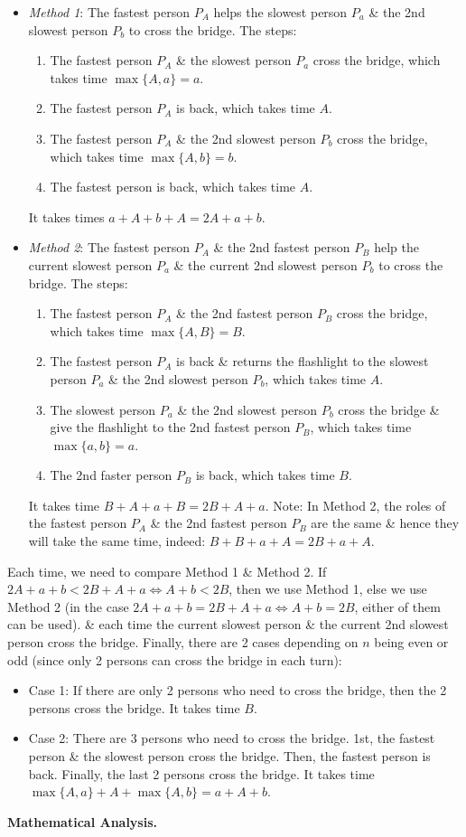 \documentclass{article}
\begin{document}
\begin{itemize}
	\item {\it Method 1}: The fastest person $P_A$ helps the slowest person $P_a$ \& the 2nd slowest person $P_b$ to cross the bridge. The steps:
	\begin{enumerate}
		\item The fastest person $P_A$ \& the slowest person $P_a$ cross the bridge, which takes time $\max\{A,a\} = a$.
		\item The fastest person $P_A$ is back, which takes time $A$.
		\item The fastest person $P_A$ \& the 2nd slowest person $P_b$ cross the bridge, which takes time $\max\{A,b\} = b$.
		\item The fastest person is back, which takes time $A$.
	\end{enumerate}
	It takes times $a + A + b + A = 2A + a + b$.
	\item {\it Method 2}: The fastest person $P_A$ \& the 2nd fastest person $P_B$ help the current slowest person $P_a$ \& the current 2nd slowest person $P_b$ to cross the bridge. The steps:
	\begin{enumerate}
		\item The fastest person $P_A$ \& the 2nd fastest person $P_B$ cross the bridge, which takes time $\max\{A,B\} = B$.
		\item The fastest person $P_A$ is back \& returns the flashlight to the slowest person $P_a$ \& the 2nd slowest person $P_b$, which takes time $A$.
		\item The slowest person $P_a$ \& the 2nd slowest person $P_b$ cross the bridge \& give the flashlight to the 2nd fastest person $P_B$, which takes time $\max\{a,b\} = a$.
		\item The 2nd faster person $P_B$ is back, which takes time $B$.
	\end{enumerate}
	It takes time $B + A + a + B = 2B + A + a$. Note: In Method 2, the roles of the fastest person $P_A$ \& the 2nd fastest person $P_B$ are the same \& hence they will take the same time, indeed: $B + B + a + A = 2B + a + A$.
\end{itemize}
Each time, we need to compare Method 1 \& Method 2. If $2A + a + b < 2B + A + a\Leftrightarrow A + b < 2B$, then we use Method 1, else we use Method 2 (in the case $2A + a + b = 2B + A + a\Leftrightarrow A + b = 2B$, either of them can be used). \& each time the current slowest person \& the current 2nd slowest person cross the bridge. Finally, there are 2 cases depending on $n$ being even or odd (since only 2 persons can cross the bridge in each turn):
\begin{itemize}
	\item Case 1: If there are only 2 persons who need to cross the bridge, then the 2 persons cross the bridge. It takes time $B$.
	\item Case 2: There are 3 persons who need to cross the bridge. 1st, the fastest person \& the slowest person cross the bridge. Then, the fastest person is back. Finally, the last 2 persons cross the bridge. It  takes time $\max\{A,a\} + A + \max\{A,b\} = a + A + b$.
\end{itemize}
\textbf{\textsf{Mathematical Analysis.}}
\end{document}
